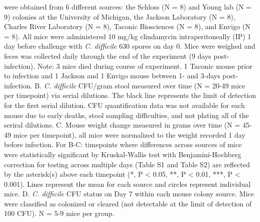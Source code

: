 \documentclass[11pt,]{article}
\begin{document}
were obtained from 6 different sources: the Schloss (N = 8) and Young
lab (N = 9) colonies at the University of Michigan, the Jackson
Laboratory (N = 8), Charles River Laboratory (N = 8), Taconic
Biosciences (N = 8), and Envigo (N = 8). All mice were administered 10
mg/kg clindamycin intraperitoneally (IP) 1 day before challenge with
\emph{C. difficile} 630 spores on day 0. Mice were weighed and feces was
collected daily through the end of the experiment (9 days
post-infection). Note: 3 mice died during course of experiment. 1
Taconic mouse prior to infection and 1 Jackson and 1 Envigo mouse
between 1- and 3-days post-infection. B. \emph{C. difficile} CFU/gram
stool measured over time (N = 20-49 mice per timepoint) via serial
dilutions. The black line represents the limit of detection for the
first serial dilution. CFU quantification data was not available for
each mouse due to early deaths, stool sampling difficulties, and not
plating all of the seriral dilutions. C. Mouse weight change measured in
grams over time (N = 45-49 mice per timepoint), all mice were normalized
to the weight recorded 1 day before infection. For B-C: timepoints where
differences across sources of mice were statistically significant by
Kruskal-Wallis test with Benjamini-Hochberg correction for testing
across multiple days (Table S1 and Table S2) are reflected by the
asterisk(s) above each timepoint (*, P \textless{} 0.05, **, P
\textless{} 0.01, ***, P \textless{} 0.001). Lines represent the mean
for each source and circles represent individual mice. D. \emph{C.
difficile} CFU status on Day 7 within each mouse colony source. Mice
were classified as colonized or cleared (not detectable at the limit of
detection of 100 CFU). N = 5-9 mice per group.

\newpage
\end{document}
